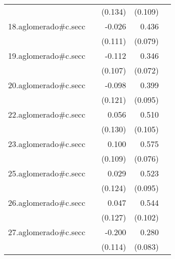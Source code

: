 {\begin{longtable}{l*{4}{D{.}{.}{-1}}}
            &                     &     (0.134)         &     (0.109)         &                     \\
\addlinespace
18.aglomerado#c.secc&                     &      -0.026         &       0.436\sym{***}&                     \\
            &                     &     (0.111)         &     (0.079)         &                     \\
\addlinespace
19.aglomerado#c.secc&                     &      -0.112         &       0.346\sym{***}&                     \\
            &                     &     (0.107)         &     (0.072)         &                     \\
\addlinespace
20.aglomerado#c.secc&                     &      -0.098         &       0.399\sym{***}&                     \\
            &                     &     (0.121)         &     (0.095)         &                     \\
\addlinespace
22.aglomerado#c.secc&                     &       0.056         &       0.510\sym{***}&                     \\
            &                     &     (0.130)         &     (0.105)         &                     \\
\addlinespace
23.aglomerado#c.secc&                     &       0.100         &       0.575\sym{***}&                     \\
            &                     &     (0.109)         &     (0.076)         &                     \\
\addlinespace
25.aglomerado#c.secc&                     &       0.029         &       0.523\sym{***}&                     \\
            &                     &     (0.124)         &     (0.095)         &                     \\
\addlinespace
26.aglomerado#c.secc&                     &       0.047         &       0.544\sym{***}&                     \\
            &                     &     (0.127)         &     (0.102)         &                     \\
\addlinespace
27.aglomerado#c.secc&                     &      -0.200         &       0.280\sym{***}&                     \\
            &                     &     (0.114)         &     (0.083)         &                     \\

\end{longtable}}
